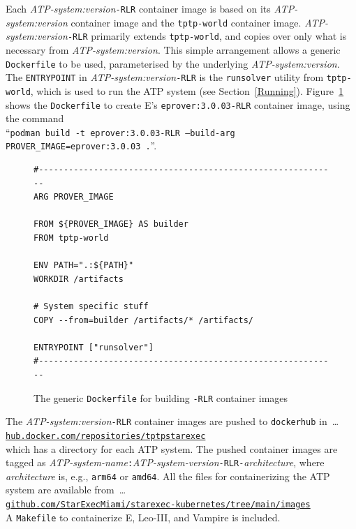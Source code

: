 \documentclass{easychair}
\begin{document}
Each {\em ATP-system:version}{\tt -RLR} container image is based on its
{\em ATP-system:version} container image and the {\tt tptp-world} container image.
{\em ATP-system:version}{\tt -RLR} primarily extends {\tt tptp-world}, and
copies over only what is necessary from {\em ATP-system:version}.
This simple arrangement allows a generic {\tt Dockerfile} to be used, parameterised by the
underlying {\em ATP-system:version}.
The {\tt ENTRYPOINT} in {\em ATP-system:version}{\tt -RLR} is the {\tt runsolver} utility from
{\tt tptp-world}, which is used to run the ATP system (see Section~\ref{Running}).
Figure~\ref{Dockerfile---RLR} shows the {\tt Dockerfile} to create E's {\tt eprover:3.0.03-RLR} 
container image, using the command  \\
``{\tt podman~build~-t~eprover:3.0.03-RLR~--build-arg PROVER\_IMAGE=eprover:3.0.03~.}''.

\begin{figure}[htb]
{\small
\begin{verbatim}
#------------------------------------------------------------
ARG PROVER_IMAGE

FROM ${PROVER_IMAGE} AS builder
FROM tptp-world

ENV PATH=".:${PATH}"
WORKDIR /artifacts

# System specific stuff 
COPY --from=builder /artifacts/* /artifacts/

ENTRYPOINT ["runsolver"]
#------------------------------------------------------------
\end{verbatim}
}
\caption{The generic {\tt Dockerfile} for building {\tt -RLR} container images}
\label{Dockerfile---RLR}
\end{figure}

The {\em ATP-system:version}{\tt -RLR} container images are pushed to {\tt dockerhub} in~\ldots\\
\hspace*{1cm}\href{https://hub.docker.com/repositories/tptpstarexec}{\tt hub.docker.com/repositories/tptpstarexec}\\
which has a directory for each ATP system.
The pushed container images are tagged as 
{\em ATP-system-name}{\tt :}{\em ATP-system-version}{\tt -RLR-}{\em architecture},
where {\em architecture} is, e.g., {\tt arm64} or {\tt amd64}.
All the files for containerizing the ATP system are available from~\ldots \\
\hspace*{1cm}\href{https://github.com/StarExecMiami/starexec-kubernetes/tree/main/images}{\tt github.com/StarExecMiami/starexec-kubernetes/tree/main/images}\\
A {\tt Makefile} to containerize E, Leo-III, and Vampire is included.
\end{document}
